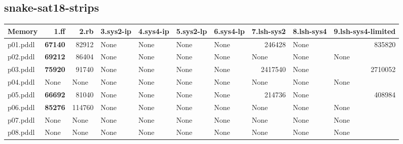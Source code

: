 \documentclass{article}
\begin{document}
\hypertarget{memory-snake-sat18-strips}{}
\subsection*{snake-sat18-strips}

\begin{tabular}{@{}lrrrrrrrrr@{}}
Memory & 1.ff & 2.rb & 3.sys2-ip & 4.sys4-ip & 5.sys2-lp & 6.sys4-lp & 7.lsh-sys2 & 8.lsh-sys4 & 9.lsh-sys4-limited \\
\midrule
p01.pddl & \textbf{67140} & 82912 & \multicolumn{1}{|l|}{None} & \multicolumn{1}{|l|}{None} & \multicolumn{1}{|l|}{None} & \multicolumn{1}{|l|}{None} & 246428 & \multicolumn{1}{|l|}{None} & 835820 \\
p02.pddl & \textbf{69212} & 86404 & \multicolumn{1}{|l|}{None} & \multicolumn{1}{|l|}{None} & \multicolumn{1}{|l|}{None} & \multicolumn{1}{|l|}{None} & \multicolumn{1}{|l|}{None} & \multicolumn{1}{|l|}{None} & \multicolumn{1}{|l|}{None} \\
p03.pddl & \textbf{75920} & 91740 & \multicolumn{1}{|l|}{None} & \multicolumn{1}{|l|}{None} & \multicolumn{1}{|l|}{None} & \multicolumn{1}{|l|}{None} & 2417540 & \multicolumn{1}{|l|}{None} & 2710052 \\
p04.pddl & \multicolumn{1}{|l|}{None} & \multicolumn{1}{|l|}{None} & \multicolumn{1}{|l|}{None} & \multicolumn{1}{|l|}{None} & \multicolumn{1}{|l|}{None} & \multicolumn{1}{|l|}{None} & \multicolumn{1}{|l|}{None} & \multicolumn{1}{|l|}{None} & \multicolumn{1}{|l|}{None} \\
p05.pddl & \textbf{66692} & 81040 & \multicolumn{1}{|l|}{None} & \multicolumn{1}{|l|}{None} & \multicolumn{1}{|l|}{None} & \multicolumn{1}{|l|}{None} & 214736 & \multicolumn{1}{|l|}{None} & 408984 \\
p06.pddl & \textbf{85276} & 114760 & \multicolumn{1}{|l|}{None} & \multicolumn{1}{|l|}{None} & \multicolumn{1}{|l|}{None} & \multicolumn{1}{|l|}{None} & \multicolumn{1}{|l|}{None} & \multicolumn{1}{|l|}{None} & \multicolumn{1}{|l|}{None} \\
p07.pddl & \multicolumn{1}{|l|}{None} & \multicolumn{1}{|l|}{None} & \multicolumn{1}{|l|}{None} & \multicolumn{1}{|l|}{None} & \multicolumn{1}{|l|}{None} & \multicolumn{1}{|l|}{None} & \multicolumn{1}{|l|}{None} & \multicolumn{1}{|l|}{None} & \multicolumn{1}{|l|}{None} \\
p08.pddl & \multicolumn{1}{|l|}{None} & \multicolumn{1}{|l|}{None} & \multicolumn{1}{|l|}{None} & \multicolumn{1}{|l|}{None} & \multicolumn{1}{|l|}{None} & \multicolumn{1}{|l|}{None} & \multicolumn{1}{|l|}{None} & \multicolumn{1}{|l|}{None} & \multicolumn{1}{|l|}{None} \\

\end{tabular}
\end{document}
